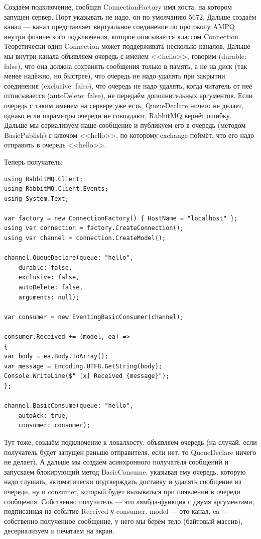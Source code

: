 \documentclass[a5paper]{article}
\begin{document}
Создаём подключение, сообщая ConnectionFactory имя хоста, на котором запущен сервер. Порт указывать не надо, он по умолчанию 5672. Дальше создаём канал --- канал представляет виртуальное соединение по протоколу AMPQ внутри физического подключения, которое описывается классом Connection. Теоретически один Connection может поддерживать несколько каналов. Дальше мы внутри канала объявляем очередь с именем <<hello>>, говорим (durable: false), что она должна сохранять сообщения только в память, а не на диск (так менее надёжно, но быстрее), что очередь не надо удалять при закрытии соединения (exclusive: false), что очередь не надо удалять, когда читатель от неё отписывается (autoDelete: false), не передаём дополнительных аргументов. Если очередь с таким именем на сервере уже есть, QueueDeclare ничего не делает, однако если параметры очереди не совпадают, RabbitMQ вернёт ошибку. Дальше мы сериализуем наше сообщение и публикуем его в очередь (методом BasicPublish) с ключом <<hello>>, по которому exchange поймёт, что его надо отправить в очередь <<hello>>.

Теперь получатель:

\begin{verbatim}
using RabbitMQ.Client;
using RabbitMQ.Client.Events;
using System.Text;

var factory = new ConnectionFactory() { HostName = "localhost" };
using var connection = factory.CreateConnection();
using var channel = connection.CreateModel();

channel.QueueDeclare(queue: "hello",
    durable: false,
    exclusive: false,
    autoDelete: false,
    arguments: null);

var consumer = new EventingBasicConsumer(channel);

consumer.Received += (model, ea) =>
{
var body = ea.Body.ToArray();
var message = Encoding.UTF8.GetString(body);
Console.WriteLine($" [x] Received {message}");
};

channel.BasicConsume(queue: "hello",
    autoAck: true,
    consumer: consumer);
\end{verbatim}

Тут тоже, создаём подключение к локалхосту, объявляем очередь (на случай, если получатель будет запущен раньше отправителя, если нет, то QueueDeclare ничего не делает). А дальше мы создаём асинхронного получателя сообщений и запускаем блокирующий метод BasicConsume, указывая ему очередь, которую надо слушать, автоматически подтверждать доставку и удалять сообщение из очереди, ну и consumer, который будет вызываться при появлении в очереди сообщения. Собственно получатель --- это лямбда-функция с двумя аргументами, подписанная на событие Received у consumer. model --- это канал, ea --- собственно полученное сообщение, у него мы берём тело (байтовый массив), десериализуем и печатаем на экран.
\end{document}
